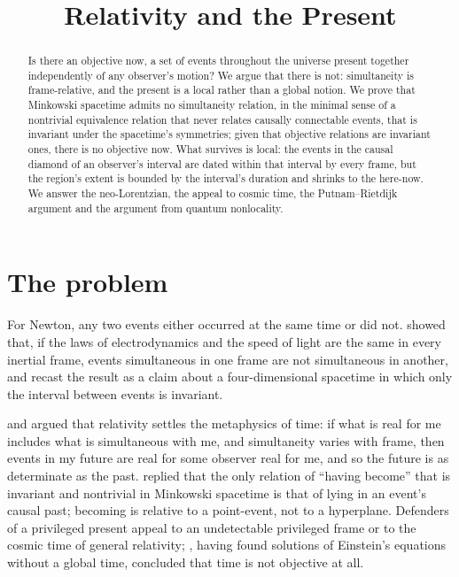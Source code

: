\documentclass{situationist-preprint}
\title{Relativity and the Present}
\begin{document}
\maketitle

\begin{abstract}
Is there an objective now, a set of events throughout the universe present together independently of any observer's motion? We argue that there is not: simultaneity is frame-relative, and the present is a local rather than a global notion. We prove that Minkowski spacetime admits no simultaneity relation, in the minimal sense of a nontrivial equivalence relation that never relates causally connectable events, that is invariant under the spacetime's symmetries; given that objective relations are invariant ones, there is no objective now. What survives is local: the events in the causal diamond of an observer's interval are dated within that interval by every frame, but the region's extent is bounded by the interval's duration and shrinks to the here-now. We answer the neo-Lorentzian, the appeal to cosmic time, the Putnam--Rietdijk argument and the argument from quantum nonlocality.
\end{abstract}

\section{The problem}

For Newton, any two events either occurred at the same time or did not. \citet{Einstein1905} showed that, if the laws of electrodynamics and the speed of light are the same in every inertial frame, events simultaneous in one frame are not simultaneous in another, and \citet{Minkowski1909} recast the result as a claim about a four-dimensional spacetime in which only the interval between events is invariant.

\citet{Rietdijk1966} and \citet{Putnam1967} argued that relativity settles the metaphysics of time: if what is real for me includes what is simultaneous with me, and simultaneity varies with frame, then events in my future are real for some observer real for me, and so the future is as determinate as the past. \citet{Stein1968,Stein1991} replied that the only relation of \enquote{having become} that is invariant and nontrivial in Minkowski spacetime is that of lying in an event's causal past; becoming is relative to a point-event, not to a hyperplane. Defenders of a privileged present appeal to an undetectable privileged frame \citep{Craig2001} or to the cosmic time of general relativity; \citet{Godel1949}, having found solutions of Einstein's equations without a global time, concluded that time is not objective at all.
\end{document}
